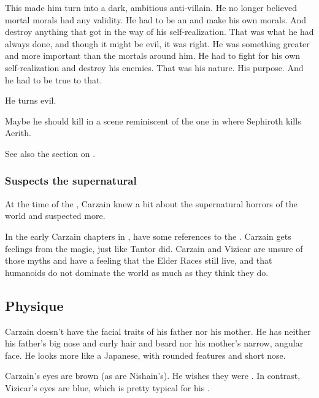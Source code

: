This made him turn into a dark, ambitious anti-villain. 
He no longer believed mortal morals had any validity. 
He had to be an \Ubermensch and make his own morals. 
And destroy anything that got in the way of his self-realization.
That was what he had always done, and though it might be evil, it was right. 
He was something greater and more important than the mortals around him. 
He had to fight for his own self-realization and destroy his enemies.
That was his nature. 
His purpose. 
And he had to be true to that. 

He turns evil. 

Maybe he should kill \Racel in a scene reminiscent of the one in \cite{VideoGame:FinalFantasyVII} where Sephiroth kills Aerith. 

See also the section on . 





\subsubsection{Suspects the supernatural}
At the time of the , Carzain knew a bit about the supernatural horrors of the world and suspected more. 

In the early Carzain chapters in \TwilightAngelRememberEmph, have some references to the . 
Carzain gets  feelings from the \EreshKali{} magic, just like Tantor did. 
Carzain and Vizicar are unsure of those myths and have a feeling that the Elder Races still live, and that humanoids do not dominate the world as much as they think they do. 








\subsection{Physique}
Carzain doesn't have the facial traits of his father nor his mother. 
He has neither his father's big nose and curly hair and beard nor his mother's narrow, angular face. 
He looks more like a Japanese, with rounded features and short nose. 

Carzain's eyes are brown (as are Nishain's). 
He wishes they were . 
In contrast, Vizicar's eyes are blue, which is pretty typical for his \vclan. 





